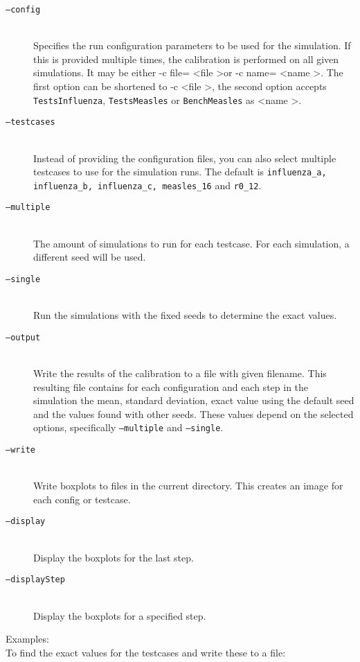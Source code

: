 \begin{description}
    \item[\texttt{--config}] \ \\
        Specifies the run configuration parameters to be used for the simulation.
        If this is provided multiple times, the calibration is performed on all given simulations.
        It may be either -c file= \textless file \textgreater or -c name= \textless name \textgreater .
        The first option can be shortened to -c \textless file \textgreater , the second option accepts \texttt{TestsInfluenza}, \texttt{TestsMeasles} or \texttt{BenchMeasles} as  \textless name \textgreater .
    \item[\texttt{--testcases}] \ \\
        Instead of providing the configuration files, you can also select multiple testcases to use for the simulation runs.
        The default is \texttt{influenza\_a, influenza\_b, influenza\_c, measles\_16} and \texttt{r0\_12}.
    \item[\texttt{--multiple}]\ \\
        The amount of simulations to run for each testcase. For each simulation, a different seed will be used.
    \item[\texttt{--single}]\ \\
        Run the simulations with the fixed seeds to determine the exact values.
    \item[\texttt{--output}]\ \\
        Write the results of the calibration to a file with given filename.
        This resulting file contains for each configuration and each step in the simulation the mean, standard deviation, exact value using the default seed and the values found with other seeds.
        These values depend on the selected options, specifically \texttt{--multiple} and \texttt{--single}.
    \item[\texttt{--write}]\ \\
        Write boxplots to files in the current directory. This creates an image for each config or testcase.
    \item[\texttt{--display}]\ \\
        Display the boxplots for the last step.
    \item[\texttt{--displayStep}]\ \\
        Display the boxplots for a specified step.
\end{description}

Examples:\\
To find the exact values for the testcases and write these to a file:\\

